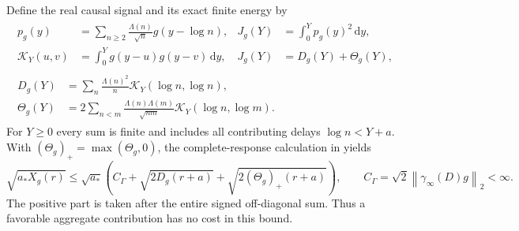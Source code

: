 \documentclass[11pt]{article}
\numberwithin{equation}{section}
\theoremstyle{definition}
\theoremstyle{remark}
\newcommand{\norm}[1]{\left\lVert #1\right\rVert}
\newcommand{\dd}{\,\mathrm d}
\begin{document}
Define the real causal signal and its exact finite energy by
\begin{equation}\label{eq:selective-local-energy}
\begin{gathered}
\begin{aligned}
p_g(y)&=\sum_{n\ge2}\frac{\Lambda(n)}{\sqrt n}g(y-\log n),
&J_g(Y)&=\int_0^Yp_g(y)^2\dd y,\\
\mathcal K_Y(u,v)&=\int_0^Yg(y-u)g(y-v)\dd y,
&J_g(Y)&=D_g(Y)+\Theta_g(Y),
\end{aligned}\\[2pt]
\begin{aligned}
D_g(Y)&=\sum_n\frac{\Lambda(n)^2}{n}\mathcal K_Y(\log n,\log n),\\
\Theta_g(Y)&=2\sum_{n<m}\frac{\Lambda(n)\Lambda(m)}{\sqrt{nm}}
\mathcal K_Y(\log n,\log m).
\end{aligned}
\end{gathered}
\end{equation}
For \(Y\ge0\) every sum is finite and includes all contributing
delays \(\log n<Y+a\). With \((\Theta_g)_+=\max(\Theta_g,0)\),
the complete-response calculation in \cite{SelectiveLossNotes} yields
\begin{equation}\label{eq:selective-signed-allowance}
\sqrt{a_*X_g(r)}\le\sqrt{a_*}
\left(C_\Gamma+\sqrt{2D_g(r+a)}
+\sqrt{2(\Theta_g)_+(r+a)}\right),\qquad
C_\Gamma=\sqrt2\norm{\gamma_\infty(D)g}_2<\infty.
\end{equation}
The positive part is taken after the entire signed off-diagonal sum.
Thus a favorable aggregate contribution has no cost in this bound.
\end{document}
